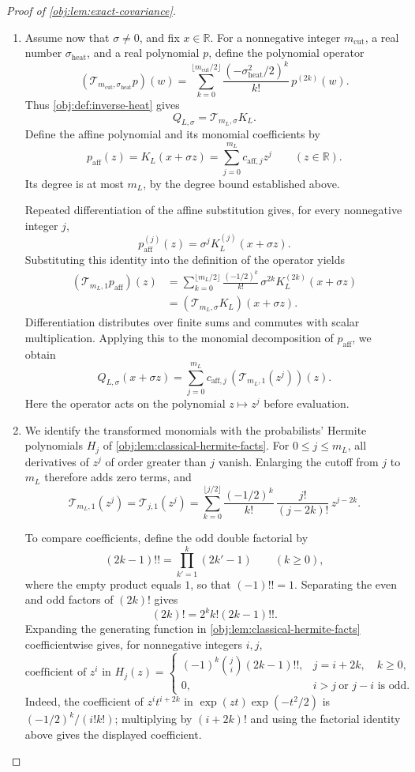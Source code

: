\documentclass[11pt]{article}
\begin{document}
\begin{proof}[Proof of \cref{obj:lem:exact-covariance}]
\begin{enumerate}
\item Assume now that \(\sigma\ne0\), and fix \(x\in\mathbb R\). For a nonnegative integer \(m_{\mathrm{cut}}\), a real number \(\sigma_{\mathrm{heat}}\), and a real polynomial \(p\), define the polynomial operator
\[
(\mathcal T_{m_{\mathrm{cut}},\sigma_{\mathrm{heat}}}p)(w)
=
\sum_{k=0}^{\lfloor m_{\mathrm{cut}}/2\rfloor}
\frac{(-\sigma_{\mathrm{heat}}^2/2)^k}{k!}\,
p^{(2k)}(w).
\]
Thus \cref{obj:def:inverse-heat} gives
\[
Q_{L,\sigma}=\mathcal T_{m_L,\sigma}K_L.
\]
Define the affine polynomial and its monomial coefficients by
\[
p_{\mathrm{aff}}(z)=K_L(x+\sigma z)
=\sum_{j=0}^{m_L}c_{\mathrm{aff},j}z^j
\qquad(z\in\mathbb R).
\]
Its degree is at most \(m_L\), by the degree bound established above.

Repeated differentiation of the affine substitution gives, for every nonnegative integer \(j\),
\[
p_{\mathrm{aff}}^{(j)}(z)
=\sigma^jK_L^{(j)}(x+\sigma z).
\]
Substituting this identity into the definition of the operator yields
\[
\begin{aligned}
(\mathcal T_{m_L,1}p_{\mathrm{aff}})(z)
&=
\sum_{k=0}^{\lfloor m_L/2\rfloor}
\frac{(-1/2)^k}{k!}\,
\sigma^{2k}K_L^{(2k)}(x+\sigma z)\\
&=
(\mathcal T_{m_L,\sigma}K_L)(x+\sigma z).
\end{aligned}
\]
Differentiation distributes over finite sums and commutes with scalar multiplication. Applying this to the monomial decomposition of \(p_{\mathrm{aff}}\), we obtain
\[
Q_{L,\sigma}(x+\sigma z)
=
\sum_{j=0}^{m_L}
c_{\mathrm{aff},j}\,
(\mathcal T_{m_L,1}(z^j))(z).
\]
Here the operator acts on the polynomial \(z\mapsto z^j\) before evaluation.

\item We identify the transformed monomials with the probabilists' Hermite polynomials \(H_j\) of \cref{obj:lem:classical-hermite-facts}. For \(0\le j\le m_L\), all derivatives of \(z^j\) of order greater than \(j\) vanish. Enlarging the cutoff from \(j\) to \(m_L\) therefore adds zero terms, and
\[
\mathcal T_{m_L,1}(z^j)
=
\mathcal T_{j,1}(z^j)
=
\sum_{k=0}^{\lfloor j/2\rfloor}
\frac{(-1/2)^k}{k!}\,
\frac{j!}{(j-2k)!}\,z^{j-2k}.
\]

To compare coefficients, define the odd double factorial by
\[
(2k-1)!!=\prod_{k'=1}^{k}(2k'-1)
\qquad(k\ge0),
\]
where the empty product equals \(1\), so that \((-1)!!=1\).
Separating the even and odd factors of \((2k)!\) gives
\[
(2k)!=2^k k!(2k-1)!!.
\]
Expanding the generating function in \cref{obj:lem:classical-hermite-facts} coefficientwise gives, for nonnegative integers \(i,j\),
\[
\text{coefficient of \(z^i\) in \(H_j(z)\)}
=
\begin{cases}
(-1)^k\binom ji(2k-1)!!,
& j=i+2k,\quad k\ge0,\\
0,
& i>j\ \text{or }j-i\text{ is odd}.
\end{cases}
\]
Indeed, the coefficient of \(z^it^{i+2k}\) in
\(\exp(zt)\exp(-t^2/2)\) is
\((-1/2)^k/(i!k!)\); multiplying by \((i+2k)!\) and using the factorial identity above gives the displayed coefficient.


\end{enumerate}
\end{proof}
\end{document}
